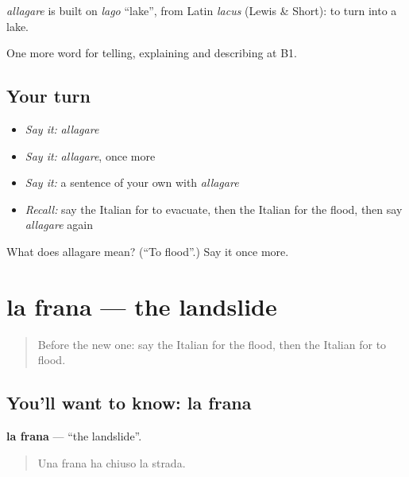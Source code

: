 \begin{cousinweb}
\emph{allagare} is built on \emph{lago} \textquotedblleft{}lake\textquotedblright{}, from Latin \emph{lacus} (Lewis \& Short): to turn into a lake.
\end{cousinweb}

\begin{grammarlens}[title={What you've built}]
One more word for telling, explaining and describing at B1.
\end{grammarlens}

\subsection*{Your turn}
\begin{itemize}
\raggedright
  \item \emph{Say it:} \emph{allagare}
  \item \emph{Say it:} \emph{allagare}, once more
  \item \emph{Say it:} a sentence of your own with \emph{allagare}
  \item \emph{Recall:} say the Italian for to evacuate, then the Italian for the flood, then say \emph{allagare} again
\end{itemize}

\begin{tcolorbox}[breakable,colback=teal!4,colframe=teal!35!black,title={Before you move on}]
What does allagare mean? (\textquotedblleft{}To flood\textquotedblright{}.) Say it once more.
\end{tcolorbox}
\section[la frana]{la frana — the landslide}

\label{lesson:IT-C305-frana}



\begin{quote}
Before the new one: say the Italian for the flood, then the Italian for to flood.
\end{quote}

\subsection*{You'll want to know: la frana}
\textbf{la frana} — \textquotedblleft{}the landslide\textquotedblright{}.

\begin{quote}
Una frana ha chiuso la strada.
\end{quote}

